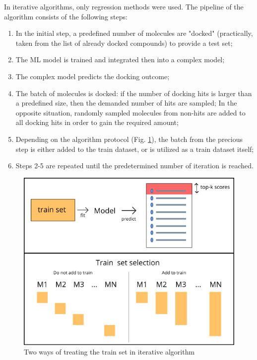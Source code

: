 In iterative algorithms, only regression methods were used.
The pipeline of the algorithm consists of the following steps:
\begin{enumerate}
    \item In the initial step, a predefined number of molecules are "docked" (practically, taken from the list of already docked compounds) to provide a test set;
    \item The ML model is trained and integrated then into a complex model;
    \item The complex model predicts the docking outcome;
    \item The batch of molecules is docked: if the number of docking hits is larger than a predefined size, then the demanded number of hits are sampled;
    In the opposite situation, randomly sampled molecules from non-hits are added to all docking hits in order to gain the required amount;
    \item Depending on the algorithm protocol (Fig. \ref{TrainSetSelection}), the batch from the precious step is either added to the train dataset, or is utilized as a train dataset itself;
    \item Steps 2-5 are repeated until the predetermined number of iteration is reached.
\end{enumerate}

\begin{figure}[H]
    \centering
    \includegraphics[scale=0.72]{Images/image1.png}
    \caption{Two ways of treating the train set in iterative algorithm}
    \label{TrainSetSelection}
\end{figure}

